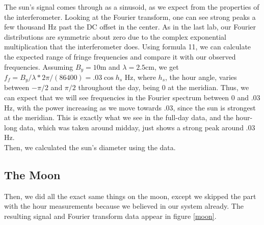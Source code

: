 \documentclass[11pt]{article}
\begin{document}
The sun's signal comes through as a sinusoid, as we expect from the properties of the interferometer. Looking at the Fourier transform, one can see strong peaks a few thousand Hz past the DC offset in the center. As in the last lab, our Fourier distributions are symmetric about zero due to the complex exponential multiplication that the interferometer does. Using formula 11, we can calculate the expected range of fringe frequencies and compare it with our observed frequencies. Assuming $B_y = 10$m and $\lambda = 2.5$cm, we get $f_f = B_y / \lambda * 2\pi / (86400) = .03\cos{h_s}$ Hz, where $h_s$, the hour angle, varies between $-\pi/2$ and $\pi/2$ throughout the day, being 0 at the meridian. Thus, we can expect that we will see frequencies in the Fourier spectrum between 0 and $.03$ Hz, with the power increasing as we move towards .03, since the sun is strongest at the meridian. This is exactly what we see in the full-day data, and the hour-long data, which was taken around midday, just shows a strong peak around .03 Hz. \\
Then, we calculated the sun's diameter using the data. %

\subsection{The Moon}
Then, we did all the exact same things on the moon, except we skipped the part with the hour measurements because we believed in our system already. The resulting signal and Fourier transform data appear in figure \ref{moon}.
\end{document}
